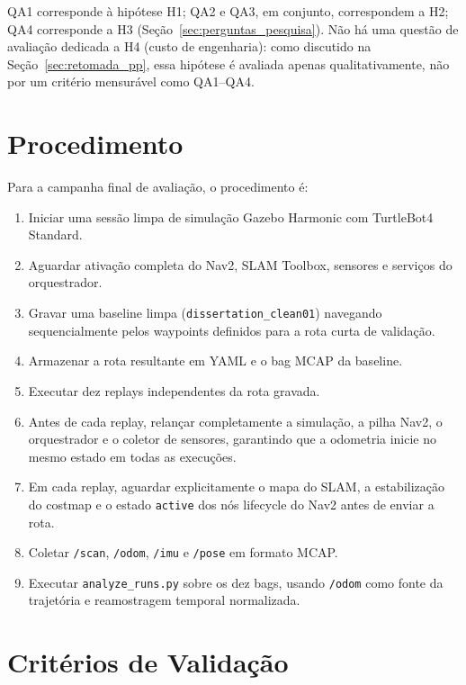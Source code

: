 QA1 corresponde à hipótese H1; QA2 e QA3, em conjunto, correspondem a H2; QA4
corresponde a H3 (Seção~\ref{sec:perguntas_pesquisa}). Não há uma questão de
avaliação dedicada a H4 (custo de engenharia): como discutido na
Seção~\ref{sec:retomada_pp}, essa hipótese é avaliada apenas qualitativamente,
não por um critério mensurável como QA1--QA4.

\section{Procedimento}
\label{sec:procedimento}

Para a campanha final de avaliação, o procedimento é:

\begin{enumerate}
    \item Iniciar uma sessão limpa de simulação Gazebo Harmonic com TurtleBot4
    Standard.
    \item Aguardar ativação completa do Nav2, SLAM Toolbox, sensores e serviços
    do orquestrador.
    \item Gravar uma baseline limpa (\texttt{dissertation\_\allowbreak clean01}) navegando
    sequencialmente pelos waypoints definidos para a rota curta de validação.
    \item Armazenar a rota resultante em YAML e o bag MCAP da baseline.
    \item Executar dez replays independentes da rota gravada.
    \item Antes de cada replay, relançar completamente a simulação, a pilha Nav2,
    o orquestrador e o coletor de sensores, garantindo que a odometria inicie no
    mesmo estado em todas as execuções.
    \item Em cada replay, aguardar explicitamente o mapa do SLAM, a estabilização
    do costmap e o estado \texttt{active} dos nós lifecycle do Nav2 antes de enviar
    a rota.
    \item Coletar \texttt{/\allowbreak scan}, \texttt{/\allowbreak odom}, \texttt{/\allowbreak imu} e
    \texttt{/\allowbreak pose} em formato MCAP.
    \item Executar \texttt{analyze\_\allowbreak runs.py} sobre os dez bags, usando
    \texttt{/\allowbreak odom} como fonte da trajetória e reamostragem temporal
    normalizada.
\end{enumerate}

\section{Critérios de Validação}
\label{sec:criterios}

